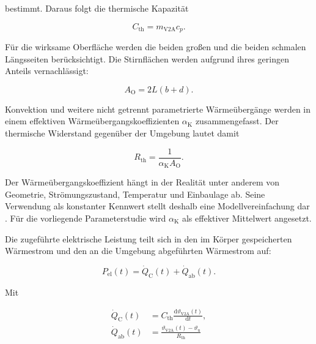 bestimmt. Daraus folgt die thermische Kapazität

\begin{equation}
    C_{\mathrm{th}}
    =m_{\mathrm{V2A}}c_{p}.
    \label{eq:modell_waermekapazitaet}
\end{equation}

Für die wirksame Oberfläche werden die beiden großen und die beiden schmalen
Längsseiten berücksichtigt. Die Stirnflächen werden aufgrund ihres geringen
Anteils vernachlässigt:

\begin{equation}
    A_{\mathrm{O}}
    =2L(b+d).
    \label{eq:modell_oberflaeche}
\end{equation}

Konvektion und weitere nicht getrennt parametrierte Wärmeübergänge werden in
einem effektiven Wärmeübergangskoeffizienten \(\alpha_{\mathrm{K}}\)
zusammengefasst. Der thermische Widerstand gegenüber der Umgebung lautet damit

\begin{equation}
    R_{\mathrm{th}}
    =\frac{1}{\alpha_{\mathrm{K}}A_{\mathrm{O}}}.
    \label{eq:modell_thermischer_widerstand}
\end{equation}

Der Wärmeübergangskoeffizient hängt in der Realität unter anderem von
Geometrie, Strömungszustand, Temperatur und Einbaulage ab. Seine Verwendung als
konstanter Kennwert stellt deshalb eine Modellvereinfachung dar
\parencite[S.~37--41]{Griesinger_Waermemanagement}. Für die vorliegende
Parameterstudie wird \(\alpha_{\mathrm{K}}\) als effektiver Mittelwert
angesetzt.

Die zugeführte elektrische Leistung teilt sich in den im Körper gespeicherten
Wärmestrom und den an die Umgebung abgeführten Wärmestrom auf:

\begin{equation}
    P_{\mathrm{el}}(t)
    =
    \dot Q_{\mathrm{C}}(t)
    +
    \dot Q_{\mathrm{ab}}(t).
    \label{eq:modell_waermebilanz}
\end{equation}

Mit

\begin{align}
    \dot Q_{\mathrm{C}}(t)
    &=C_{\mathrm{th}}
      \frac{\mathrm{d}\vartheta_{\mathrm{V2A}}(t)}{\mathrm{d}t},
    \label{eq:modell_waermestrom_speicher}\\
    \dot Q_{\mathrm{ab}}(t)
    &=\frac{
        \vartheta_{\mathrm{V2A}}(t)-\vartheta_{\mathrm{u}}
      }{R_{\mathrm{th}}}
    \label{eq:modell_waermestrom_abgabe}
\end{align}

